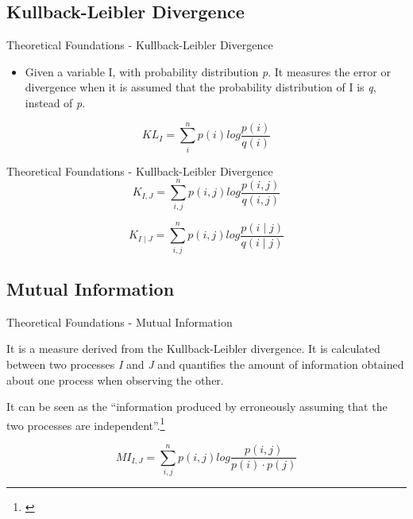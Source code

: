 \subsection{Kullback-Leibler Divergence}
\begin{frame}{{Theoretical Foundations - Kullback-Leibler Divergence}}


\begin{definition}


\begin{itemize}
    \item Given  a variable I, with probability distribution \textit{p}. It measures the error or divergence when it is assumed that the probability distribution of I is \textit{q}, instead of \textit{p}.
\end{itemize}


\begin{equation}
\label{eq:kullback}   
    KL_{I} = \sum_{i}^{n}p(i)log \frac{p(i)}{q(i)}
\end{equation}
\end{definition}
\end{frame}

\begin{frame}{Theoretical Foundations - Kullback-Leibler Divergence}
\begin{equation}
\label{eq:kullback_joint}   
    K_{I, J} = \sum_{i,j}^{n}p(i,j)log \frac{p(i,j)}{q(i,j)}
\end{equation}


\begin{equation}
\label{eq:kullback_cond}   
    K_{I \mid J} = \sum_{i,j}^{n}p(i,j)log \frac{p(i\mid j)}{q(i \mid j)}
\end{equation}


\end{frame}
\subsection{Mutual Information}
\begin{frame}{Theoretical Foundations - Mutual Information }
    \begin{definition}
    It is a measure derived from the Kullback-Leibler divergence. It is calculated between two processes \textit{I} and \textit{J} and quantifies the amount of information obtained about one process when observing the other. 

    
    It can be seen as the ``information produced by erroneously assuming that the two processes are independent''.\footnote{\cite{schreiber2000measuring}}

    \begin{equation}
        \label{eq:mutual}   
            MI_{I, J} = \sum_{i,j}^{n}p(i,j)log \frac{p(i,j)}{p(i)\cdot p(j)}
        \end{equation}
    \end{definition}

\end{frame}

